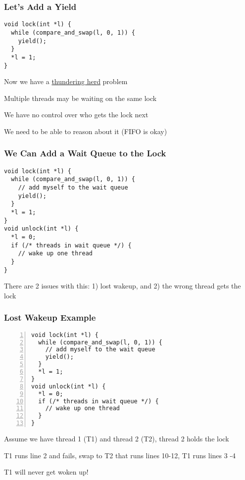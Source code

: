   \begin{frame}[fragile]
    \frametitle{Let's Add a Yield}

    \begin{lstlisting}
void lock(int *l) {
  while (compare_and_swap(l, 0, 1)) {
    yield();
  }
  *l = 1;
}
    \end{lstlisting}

    \vspace{2em}

    Now we have a 
    \href{https://en.wikipedia.org/wiki/Thundering_herd_problem}{thundering herd}
    problem

    \hspace{2em} Multiple threads may be waiting on the same lock

    \vspace{2em}

    We have no control over who gets the lock next

    \hspace{2em} We need to be able to reason about it (FIFO is okay)
  \end{frame}

  \begin{frame}[fragile]
    \frametitle{We Can Add a Wait Queue to the Lock}

    \begin{lstlisting}
void lock(int *l) {
  while (compare_and_swap(l, 0, 1)) {
    // add myself to the wait queue
    yield();
  }
  *l = 1;
}
void unlock(int *l) {
  *l = 0;
  if (/* threads in wait queue */) {
    // wake up one thread
  }
}
    \end{lstlisting}

    There are 2 issues with this: 1) lost wakeup, and 2) the wrong thread gets
    the lock
  \end{frame}

  \begin{frame}[fragile]
    \frametitle{Lost Wakeup Example}

    \begin{lstlisting}[numbers=left]
void lock(int *l) {
  while (compare_and_swap(l, 0, 1)) {
    // add myself to the wait queue
    yield();
  }
  *l = 1;
}
void unlock(int *l) {
  *l = 0;
  if (/* threads in wait queue */) {
    // wake up one thread
  }
}
    \end{lstlisting}

    Assume we have thread 1 (T1) and thread 2 (T2), thread 2 holds the lock

    \hspace{2em} T1 runs line 2 and fails, swap to T2 that runs lines 10-12, T1
    runs lines 3 -4

    \hspace{4em} T1 will never get woken up!
  \end{frame}

